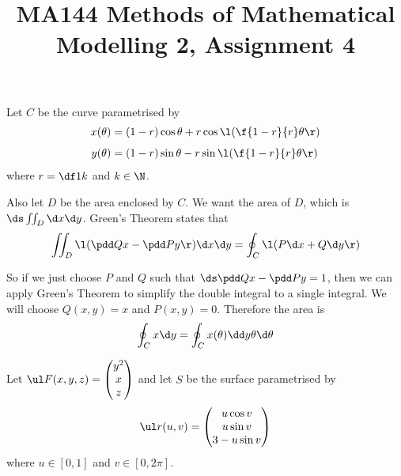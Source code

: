 \documentclass[a4paper]{article}
\title{MA144 Methods of Mathematical Modelling 2, Assignment 4}
\begin{document}
\maketitle

\setlength{\parindent}{0em}
\setlength{\parskip}{1em}


Let $C$ be the curve parametrised by \begin{align*}
x(\theta) &= (1-r) \cos \theta + r \cos \l( \f{1-r}{r} \theta \r) \\[1ex]
y(\theta) &= (1-r) \sin \theta - r \sin \l( \f{1-r}{r} \theta \r)
\end{align*}
where $r = \df1k$ and $k \in \N$.

Also let $D$ be the area enclosed by $C$. We want the area of $D$, which is $\ds \iint_D \d x \d y$. Green's Theorem states that $$\iint_D \l( \pdd Qx - \pdd Py \r) \d x \d y = \oint_C \l( P \d x + Q \d y \r)$$

So if we just choose $P$ and $Q$ such that $\ds \pdd Qx - \pdd Py = 1$, then we can apply Green's Theorem to simplify the double integral to a single integral. We will choose $Q(x, y) = x$ and $P(x, y) = 0$. Therefore the area is $$\oint_C x \d y = \oint_C x(\theta) \dd y\theta \d \theta$$



Let $\ul F(x, y, z) = \begin{pmatrix} y^2 \\ x \\ z \end{pmatrix}$ and let $S$ be the surface parametrised by $$\ul r(u,v) = \begin{pmatrix} u \cos v \\ u \sin v \\ 3 - u \sin v \end{pmatrix}$$
where $u \in [0,1]$ and $v \in [0, 2\pi]$.

\subsection{~}
\end{document}
